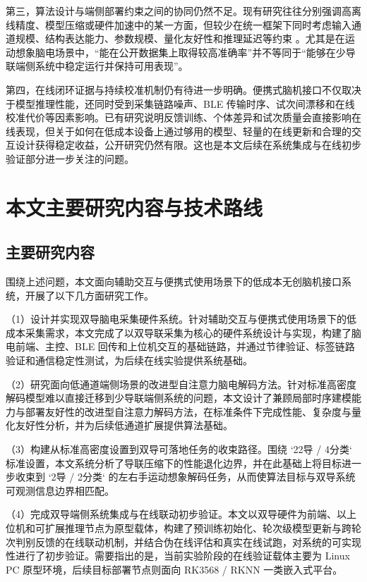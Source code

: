 第三，算法设计与端侧部署约束之间的协同仍然不足。现有研究往往分别强调高离线精度、模型压缩或硬件加速中的某一方面，但较少在统一框架下同时考虑输入通道规模、结构表达能力、参数规模、量化友好性和推理延迟等约束 \cite{keu2024compact, wan2023novel, hua2023improved}。尤其是在运动想象脑电场景中，“能在公开数据集上取得较高准确率”并不等同于“能够在少导联端侧系统中稳定运行并保持可用表现”。

第四，在线闭环证据与持续校准机制仍有待进一步明确。便携式脑机接口不仅取决于模型推理性能，还同时受到采集链路噪声、BLE 传输时序、试次间漂移和在线校准代价等因素影响。已有研究说明反馈训练、个体差异和试次质量会直接影响在线表现，但关于如何在低成本设备上通过够用的模型、轻量的在线更新和合理的交互设计获得稳定收益，公开研究仍然有限。这也是本文后续在系统集成与在线初步验证部分进一步关注的问题。

\section{本文主要研究内容与技术路线}
\subsection{主要研究内容}

围绕上述问题，本文面向辅助交互与便携式使用场景下的低成本无创脑机接口系统，开展了以下几方面研究工作。

（1）设计并实现双导脑电采集硬件系统。针对辅助交互与便携式使用场景下的低成本采集需求，本文完成了以双导联采集为核心的硬件系统设计与实现，构建了脑电前端、主控、BLE 回传和上位机交互的基础链路，并通过节律验证、标签链路验证和通信稳定性测试，为后续在线实验提供系统基础。

（2）研究面向低通道端侧场景的改进型自注意力脑电解码方法。针对标准高密度解码模型难以直接迁移到少导联端侧系统的问题，本文设计了兼顾局部时序建模能力与部署友好性的改进型自注意力解码方法，在标准条件下完成性能、复杂度与量化友好性分析，并为后续低通道扩展提供算法基础。

（3）构建从标准高密度设置到双导可落地任务的收束路径。围绕 `22导 / 4分类` 标准设置，本文系统分析了导联压缩下的性能退化边界，并在此基础上将目标进一步收束到 `2导 / 2分类` 的左右手运动想象解码任务，从而使算法目标与双导系统可观测信息边界相匹配。

（4）完成双导端侧系统集成与在线联动初步验证。本文以双导硬件为前端、以上位机和可扩展推理节点为原型载体，构建了预训练初始化、轮次级模型更新与跨轮次判别反馈的在线联动机制，并结合伪在线评估和真实在线试跑，对系统的可实现性进行了初步验证。需要指出的是，当前实验阶段的在线验证载体主要为 Linux PC 原型环境，后续目标部署节点则面向 RK3568 / RKNN 一类嵌入式平台。

